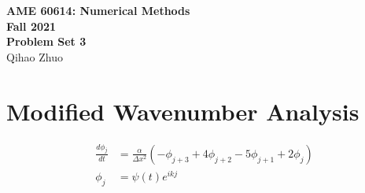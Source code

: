 \documentclass[letterpaper,10pt]{article}
\begin{document}
\fancyhf{}
\fancyfoot[C]{\thepage}

\thispagestyle{plain}
\begin{center}
  \large
  \textbf{AME 60614: Numerical Methods} \\
  \textbf{Fall 2021} \\
  \vspace{0.5em}
  \textbf{Problem Set 3} \\
  \vspace{1em}
  Qihao Zhuo
\end{center}

\vspace{1.5em}

\section{Modified Wavenumber Analysis}\label{sec1}
\begin{align*}
  \frac{d\phi_j}{dt}&=\frac{\alpha}{\Delta x^2}\left(-\phi_{j+3}+4\phi_{j+2}-5\phi_{j+1}+2\phi_j\right)\\
  \phi_j &= \psi(t)e^{ikj}
\end{align*}

\end{document}
